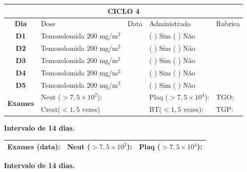 \documentclass[11pt,a4paper,oldfontcommands]{memoir}
\begin{document}
\begin{center}
\begin{longtable}{p{1cm}p{4cm}|p{1cm}|p{4.6cm}|p{3cm}}
	\hline
	\multicolumn{5}{c}{\textbf{CICLO 4}}\\
\hline
    \multicolumn{1}{c|}{\multirow{1}{*}{\textbf{Dia}}}&{Dose}&{Data}&{Administrado}&{Rubrica} \\
    \hline
    \multicolumn{1}{c|}{\multirow{1}{*}{\textbf{D1}}}&{Temozolomida \(200\) mg/m\(^2\)}&&{(  ) Sim (  ) Não}&\\
    \multicolumn{1}{c|}{\multirow{1}{*}{\textbf{D2}}}&{Temozolomida \(200\) mg/m\(^2\)}&&{(  ) Sim (  ) Não}&\\
    \multicolumn{1}{c|}{\multirow{1}{*}{\textbf{D3}}}&{Temozolomida \(200\) mg/m\(^2\)}&&{(  ) Sim (  ) Não}&\\
    \multicolumn{1}{c|}{\multirow{1}{*}{\textbf{D4}}}&{Temozolomida \(200\) mg/m\(^2\)}&&{(  ) Sim (  ) Não}&\\
    \multicolumn{1}{c|}{\multirow{1}{*}{\textbf{D5}}}&{Temozolomida \(200\) mg/m\(^2\)}&&{(  ) Sim (  ) Não}&\\
    \hline
    \multicolumn{1}{c|}{\multirow{2}{*}{\textbf{Exames}}}&\multicolumn{2}{l|}{Neut (\(>7,5\times10^2\)):}&{Plaq (\(>7,5\times10^4\)):}&{TGO:}\\
    \cline{2-5}
    \multicolumn{1}{c|}{\multirow{2}{*}{{}}}&\multicolumn{2}{l|}{Creat(\(<1,5\) vezes)}&{BT(\(<1,5\) vezes):}&{TGP:}
    \\
    \hline
\end{longtable}
\textbf{Intervalo de 14 dias.}
\begin{longtable}{p{5cm}|p{5cm}|p{4.5cm}}
    \hline
    \textbf{Exames (data):}&{Neut (\(>7,5\times10^2\)):}&{Plaq (\(>7,5\times10^4\)):}
    \\
    \hline
\end{longtable}
\textbf{Intervalo de 14 dias.}
\end{center}
\end{document}

